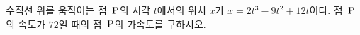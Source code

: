 수직선 위를 움직이는 점~$\mathrm{P}$의 시각 $t$에서의 위치 $x$가 $x=2t^3-9t^2+12t$이다. 점~$\mathrm{P}$의 속도가 $72$일 때의 점~$\mathrm{P}$의 가속도를 구하시오.
